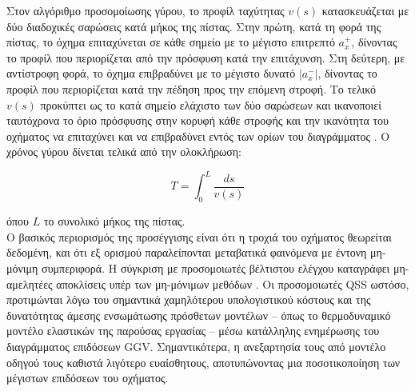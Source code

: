 Στον αλγόριθμο προσομοίωσης γύρου, το προφίλ ταχύτητας $v(s)$ κατασκευάζεται με δύο διαδοχικές σαρώσεις κατά μήκος της
πίστας. Στην πρώτη, κατά τη φορά της πίστας, το όχημα επιταχύνεται σε κάθε σημείο με
το μέγιστο επιτρεπτό $a_x^+$, δίνοντας το προφίλ που περιορίζεται από την πρόσφυση κατά
την επιτάχυνση. Στη δεύτερη, με αντίστροφη φορά, το όχημα επιβραδύνει με το μέγιστο δυνατό
$|a_x^-|$, δίνοντας το προφίλ που περιορίζεται κατά την πέδηση προς την επόμενη στροφή.
Το τελικό $v(s)$ προκύπτει ως το κατά σημείο ελάχιστο των δύο σαρώσεων και ικανοποιεί
ταυτόχρονα το όριο πρόσφυσης στην κορυφή κάθε στροφής και την ικανότητα του οχήματος να
επιταχύνει και να επιβραδύνει εντός των ορίων του διαγράμματος \cite{Brayshaw2005}. Ο χρόνος
γύρου δίνεται τελικά από την ολοκλήρωση:

\begin{equation}
    T = \int_{0}^{L}\dfrac{ds}{v(s)}
    \label{eq:lapTimeIntegral}
\end{equation}

όπου $L$ το συνολικό μήκος της πίστας.\\[10pt]

Ο βασικός περιορισμός της προσέγγισης είναι ότι η τροχιά του οχήματος
θεωρείται δεδομένη, και ότι εξ ορισμού παραλείπονται μεταβατικά φαινόμενα με έντονη μη-μόνιμη
συμπεριφορά. Η σύγκριση με προσομοιωτές βέλτιστου ελέγχου καταγράφει μη-αμελητέες
αποκλίσεις υπέρ των μη-μόνιμων μεθόδων \cite{Perantoni2014}. Οι προσομοιωτές QSS ωστόσο, προτιμώνται λόγω του σημαντικά χαμηλότερου υπολογιστικού κόστους και της δυνατότητας
άμεσης ενσωμάτωσης πρόσθετων μοντέλων -- όπως το θερμοδυναμικό μοντέλο ελαστικών της
παρούσας εργασίας -- μέσω κατάλληλης ενημέρωσης του διαγράμματος επιδόσεων GGV. Σημαντικότερα, η ανεξαρτησία τους από μοντέλο οδηγού τους καθιστά λιγότερο ευαίσθητους, αποτυπώνοντας μια ποσοτικοποίηση των μέγιστων επιδόσεων του οχήματος. 
